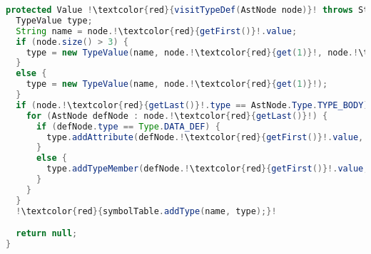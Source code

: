 \begin{lstlisting}[language=Java,escapechar=!]
protected Value !\textcolor{red}{visitTypeDef(AstNode node)}! throws StandardError {
  TypeValue type;
  String name = node.!\textcolor{red}{getFirst()}!.value;
  if (node.size() > 3) {
    type = new TypeValue(name, node.!\textcolor{red}{get(1)}!, node.!\textcolor{red}{get(2)}!.value, node.!\textcolor{red}{get(3)}!);
  }
  else {
    type = new TypeValue(name, node.!\textcolor{red}{get(1)}!);
  }
  if (node.!\textcolor{red}{getLast()}!.type == AstNode.Type.TYPE_BODY) {
    for (AstNode defNode : node.!\textcolor{red}{getLast()}!) {
      if (defNode.type == Type.DATA_DEF) {
        type.addAttribute(defNode.!\textcolor{red}{getFirst()}!.value, new Member(defNode));
      }
      else {
        type.addTypeMember(defNode.!\textcolor{red}{getFirst()}!.value, new Member(defNode));
      }
    }
  }
  !\textcolor{red}{symbolTable.addType(name, type);}!

  return null;
}
\end{lstlisting}
